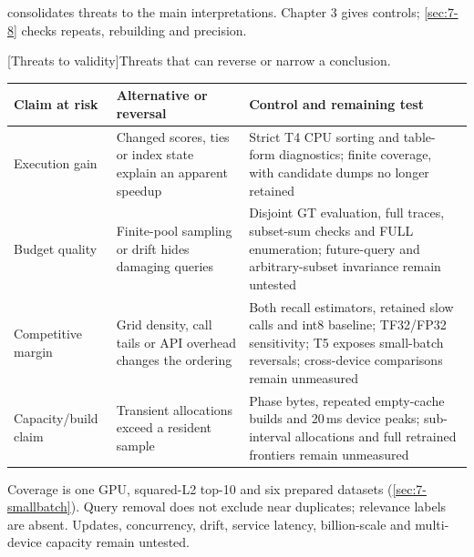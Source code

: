  consolidates threats to the main interpretations.
Chapter 3 gives controls; \cref{sec:7-8} checks repeats, rebuilding and precision.


\par\medskip\noindent\begin{minipage}{\linewidth}
\centering\captionsetup{hypcap=false}
[Threats to validity]{Threats that can reverse or narrow a conclusion.}
\label{tab:8-threats}
\footnotesize\setlength{\tabcolsep}{4pt}
\begin{tabularx}{\linewidth}{@{}*{3}{>{\raggedright\arraybackslash}X}@{}}
\toprule
Claim at risk & Alternative or reversal & Control and remaining test \\
\midrule
Execution gain & Changed scores, ties or index state explain an apparent
speedup & Strict T4 CPU sorting and table-form diagnostics; finite
coverage, with candidate dumps no longer retained \\
Budget quality & Finite-pool sampling or drift hides damaging queries
& Disjoint GT evaluation, full traces, subset-sum checks and FULL
enumeration; future-query and arbitrary-subset invariance remain untested \\
Competitive margin & Grid density, call tails or API overhead changes
the ordering & Both recall estimators, retained slow calls and int8
baseline; TF32/FP32 sensitivity; T5 exposes small-batch reversals;
cross-device comparisons remain unmeasured \\
Capacity/build claim & Transient allocations exceed a resident sample
& Phase bytes, repeated empty-cache builds and 20\,ms device peaks;
sub-interval allocations and full retrained frontiers remain unmeasured \\
\bottomrule
\end{tabularx}
\end{minipage}\par\medskip

Coverage is one GPU, squared-L2 top-10 and six prepared datasets (\cref{sec:7-smallbatch}). Query removal does not exclude near duplicates; relevance labels are absent. Updates, concurrency, drift, service latency, billion-scale and multi-device capacity remain untested.